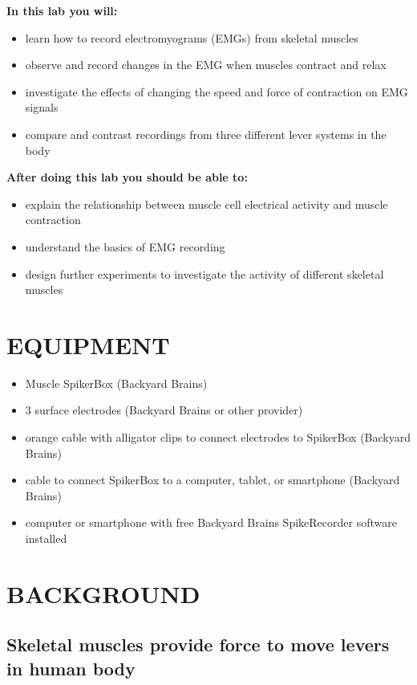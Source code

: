 \documentclass[12pt]{article}
\begin{document}
\vspace{0.3cm}

\textbf{In this lab you will:}
\begin{itemize}
\item learn how to record electromyograms (EMGs) from skeletal muscles
\item observe and record changes in the EMG when muscles contract and relax
\item investigate the effects of changing the speed and force of contraction on EMG signals
\item compare and contrast recordings from three different lever systems in the body
\end{itemize}

\vspace{0.3cm}
 
\textbf{After doing this lab you should be able to:}
\begin{itemize}
\item explain the relationship between muscle cell electrical activity and muscle contraction
\item understand the basics of EMG recording
\item design further experiments to investigate the activity of different skeletal muscles
\end{itemize}

\section*{EQUIPMENT}

 \begin{itemize}
	\item Muscle SpikerBox (Backyard Brains)
    \item 3 surface electrodes (Backyard Brains or other provider)
    \item orange cable with alligator clips to connect electrodes to SpikerBox (Backyard Brains)
    \item cable to connect SpikerBox to a computer, tablet, or smartphone (Backyard Brains)
 	\item computer or smartphone with free Backyard Brains SpikeRecorder software installed
\end{itemize}

\section*{BACKGROUND}

\subsection*{Skeletal muscles provide force to move levers in human body}
\end{document}
